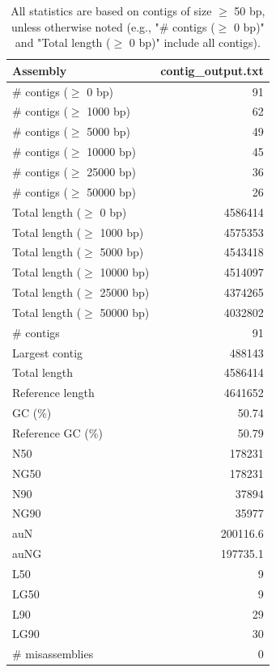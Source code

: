 \documentclass[12pt,a4paper]{article}
\begin{document}
\begin{table}[ht]
\begin{center}
\caption{All statistics are based on contigs of size $\geq$ 50 bp, unless otherwise noted (e.g., "\# contigs ($\geq$ 0 bp)" and "Total length ($\geq$ 0 bp)" include all contigs).}
\begin{tabular}{|l*{1}{|r}|}
\hline
Assembly & contig\_output.txt \\ \hline
\# contigs ($\geq$ 0 bp) & 91 \\ \hline
\# contigs ($\geq$ 1000 bp) & 62 \\ \hline
\# contigs ($\geq$ 5000 bp) & 49 \\ \hline
\# contigs ($\geq$ 10000 bp) & 45 \\ \hline
\# contigs ($\geq$ 25000 bp) & 36 \\ \hline
\# contigs ($\geq$ 50000 bp) & 26 \\ \hline
Total length ($\geq$ 0 bp) & 4586414 \\ \hline
Total length ($\geq$ 1000 bp) & 4575353 \\ \hline
Total length ($\geq$ 5000 bp) & 4543418 \\ \hline
Total length ($\geq$ 10000 bp) & 4514097 \\ \hline
Total length ($\geq$ 25000 bp) & 4374265 \\ \hline
Total length ($\geq$ 50000 bp) & 4032802 \\ \hline
\# contigs & 91 \\ \hline
Largest contig & 488143 \\ \hline
Total length & 4586414 \\ \hline
Reference length & 4641652 \\ \hline
GC (\%) & 50.74 \\ \hline
Reference GC (\%) & 50.79 \\ \hline
N50 & 178231 \\ \hline
NG50 & 178231 \\ \hline
N90 & 37894 \\ \hline
NG90 & 35977 \\ \hline
auN & 200116.6 \\ \hline
auNG & 197735.1 \\ \hline
L50 & 9 \\ \hline
LG50 & 9 \\ \hline
L90 & 29 \\ \hline
LG90 & 30 \\ \hline
\# misassemblies & 0 \\ \hline

\end{tabular}
\end{center}
\end{table}
\end{document}
